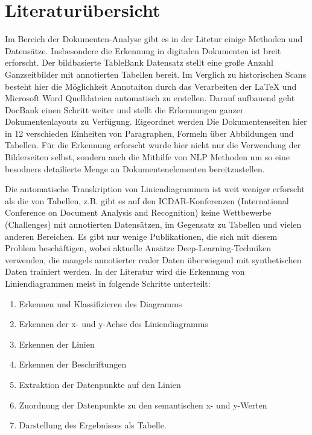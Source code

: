 \chapter{Literaturübersicht}
\label{ch:literaturübersicht}

Im Bereich der Dokumenten-Analyse gibt es in der Litetur einige Methoden und Datensätze. Insbesondere die Erkennung in digitalen Dokumenten ist breit erforscht. Der bildbasierte TableBank \cite{li2019tablebank} Datensatz stellt eine große Anzahl Ganzseitbilder mit annotierten Tabellen bereit. Im Verglich zu historischen Scans besteht hier die Möglichkeit Annotaiton durch das Verarbeiten der LaTeX und Microsoft Word Quelldateien automatisch zu erstellen. Darauf aufbauend geht DocBank \cite{li2020docbank} einen Schritt weiter und stellt die Erkennungen ganzer Dokumentenlayouts zu Verfügung. Eigeordnet werden Die Dokumentenseiten hier in 12 verschieden Einheiten von Paragraphen, Formeln über Abbildungen und Tabellen. Für die Erkennung erforscht wurde hier nicht nur die Verwendung der Bilderseiten selbst, sondern auch die Mithilfe von NLP Methoden um so eine besodners detailierte Menge an Dokumentenelementen bereitzustellen.

Die automatische Transkription von Liniendiagrammen ist weit weniger erforscht als die von Tabellen, z.B. gibt es auf den ICDAR-Konferenzen (International Conference on Document Analysis and Recognition) keine Wettbewerbe (Challenges) mit annotierten Datensätzen, im Gegensatz zu Tabellen und vielen anderen Bereichen. Es gibt nur wenige Publikationen, die sich mit diesem Problem beschäftigen, wobei aktuelle Ansätze \cite{P2023LineEXDE, lee2023matgdmaterialsgraphdigitizer} Deep-Learning-Techniken verwenden, die mangels annotierter realer Daten überwiegend mit synthetischen Daten trainiert werden. In der Literatur wird die Erkennung von Liniendiagrammen meist in folgende Schritte unterteilt:

\begin{enumerate}[itemsep=0pt, topsep=0pt]
    \item Erkennen und Klassifizieren des Diagramms
    \item Erkennen der x- und y-Achse des Liniendiagramms
    \item Erkennen der Linien
    \item Erkennen der Beschriftungen
    \item Extraktion der Datenpunkte auf den Linien
    \item Zuordnung der Datenpunkte zu den semantischen x- und y-Werten
    \item Darstellung des Ergebnisses als Tabelle.
\end{enumerate}

